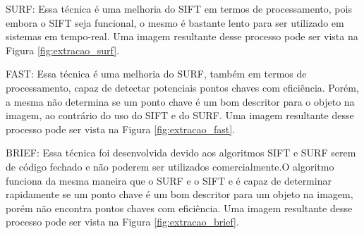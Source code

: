 \documentclass[12pt,oneside,a4paper,chapter=TITLE,section=TITLE,sumario
		=tradicional]{abntex2}
\begin{document}
\begin{lista}
			\item SURF: Essa técnica é uma melhoria do SIFT em termos de processamento, pois embora o SIFT seja funcional, o mesmo é bastante lento para ser utilizado em sistemas em tempo-real. Uma imagem resultante desse
			processo pode ser vista na Figura \ref{fig:extracao_surf}.
					
			\item FAST: Essa técnica é uma melhoria do SURF, também em termos de processamento, capaz de detectar potenciais pontos chaves com eficiência. Porém, a mesma não determina se um ponto chave é um bom descritor para o objeto na imagem, ao contrário do uso do SIFT e do SURF. Uma imagem resultante desse
			processo pode ser vista na Figura \ref{fig:extracao_fast}.
				
			\item BRIEF: Essa técnica foi desenvolvida devido aos algoritmos SIFT e SURF serem de código fechado e não poderem ser utilizados comercialmente.\hspace{0.1cm}O algoritmo funciona da mesma maneira que o SURF e o SIFT e é capaz de determinar rapidamente se um ponto chave é um bom descritor para um objeto na imagem, porém não encontra pontos chaves com eficiência. Uma imagem resultante desse processo pode ser vista na Figura \ref{fig:extracao_brief}.
			
			\begin{figure}[h]
			\end{figure}
			
			\begin{figure}[h]
					\\
			\end{figure}
			
			\begin{figure}[h]
			\end{figure}
				

\end{lista}
\end{document}
